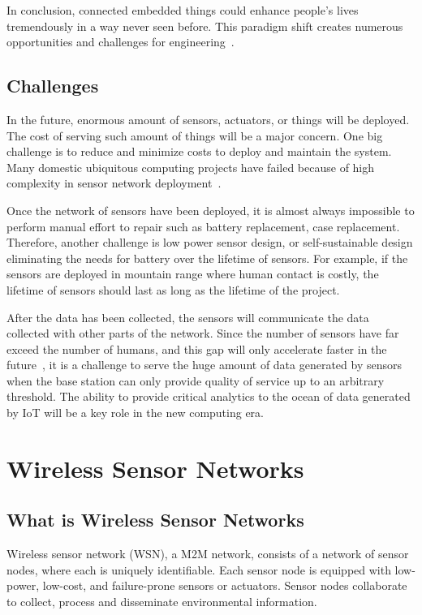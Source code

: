 In conclusion, connected embedded things could enhance people's lives
tremendously in a way never seen before. This paradigm shift creates numerous
opportunities and challenges for engineering~\cite{Chen2012}.

\subsection{Challenges}

In the future, enormous amount of sensors, actuators, or things will be
deployed. The cost of serving such amount of things will be a major concern. One
big challenge is to reduce and minimize costs to deploy and maintain the system.
Many domestic ubiquitous computing projects have failed because of high
complexity in sensor network deployment~\cite{Beckmann2004}.

Once the network of sensors have been deployed, it is almost always impossible to
perform manual effort to repair such as battery replacement, case
replacement. Therefore, another challenge is low power sensor design, or
self-sustainable design eliminating the needs for battery over the lifetime of
sensors. For example, if the sensors are deployed in mountain range where human
contact is costly, the lifetime of sensors should last as long as the lifetime
of the project.

After the data has been collected, the sensors will communicate the data
collected with other parts of the network. Since the number of sensors have far
exceed the number of humans, and this gap will only accelerate faster in the
future~\cite{CISCO}, it is a challenge to serve the huge amount of data
generated by sensors when the base station can only provide quality of service
up to an arbitrary threshold. The ability to provide critical analytics to the
ocean of data generated by IoT will be a key role in the new computing era.

\section{Wireless Sensor Networks}

\subsection{What is Wireless Sensor Networks}

Wireless sensor network (WSN), a M2M network, consists of a network of sensor
nodes, where each is uniquely identifiable. Each sensor node is equipped with
low-power, low-cost, and failure-prone sensors or actuators.  Sensor nodes
collaborate to collect, process and disseminate environmental
information\cite{ArchanaBharathidasan}.

